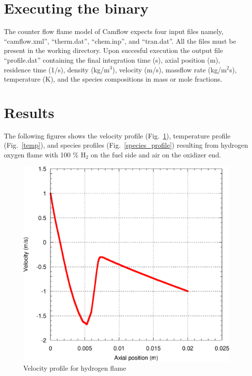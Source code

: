 \section{Executing the binary}
The counter flow flame model of Camflow expects four input files namely, ``camflow.xml'', ``therm.dat'',  ``chem.inp'', and ``tran.dat''. All the files must be present in the working directory. Upon succesful execution the output file ``profile.dat'' containing the final integration time (s), axial position (m), residence time (1/s), density (kg/m$^3$), velocity (m/s), massflow rate (kg/m$^2$s), temperature (K), and the species compositions in mass or mole fractions.

\section{Results}
The following figures shows the velocity profile (Fig.~\ref{velocity}), temperature profile (Fig.~\ref{temp}), and species profiles (Fig.~\ref{species_profile}) resulting from hydrogen oxygen flame with 100 \% H$_2$ on the fuel side and air on the oxidizer end.

\begin{figure}[h]
 \centering
\includegraphics[scale=0.6]{velocity.eps}
\caption{Velocity profile for hydrogen flame}
\label{velocity}
\end{figure}

